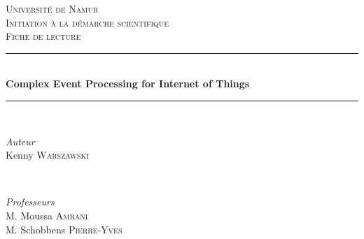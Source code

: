 \documentclass[12pt]{article}
\begin{document}

\begin{titlepage} %
	\newcommand{\HRule}{\rule{\linewidth}{0.5mm}} %
	
	\center %
	
	
	\textsc{\LARGE Université de Namur}\\[1.5cm] %
	
	\textsc{\Large Initiation à la démarche scientifique}\\[0.5cm] %
	
	\textsc{\large Fiche de lecture\\[0.5cm]} %
	
	
	\HRule\\[0.4cm]
	
	{\huge\bfseries Complex Event Processing for Internet of Things }\\[0.4cm] %
	
	\HRule\\[1.5cm]
	
	
	\begin{minipage}{0.4\textwidth}
		\begin{flushleft}
			\textit{Auteur}\\
			
			\large Kenny \textsc{Warszawski}
		\end{flushleft}

	\end{minipage}
	~
	\begin{minipage}{0.5\textwidth}
		\begin{flushright}
			\large
			\textit{Professeurs}\\
			M. Moussa \textsc{Amrani}\\
			M. Schobbens \textsc{Pierre-Yves}
		\end{flushright}
	\end{minipage}
	

\end{titlepage}
\end{document}
